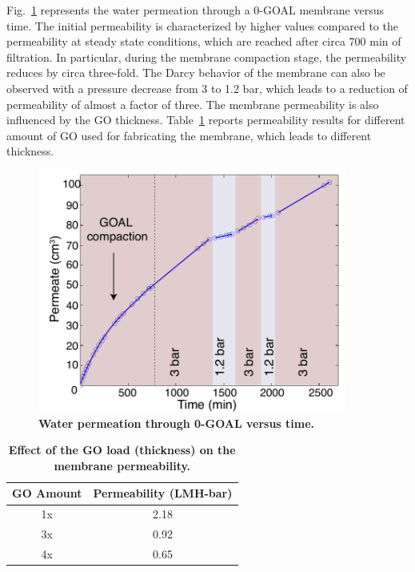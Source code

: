 Fig.~\ref{figS8_AppC} represents the water permeation through a 0-GOAL membrane versus time. The initial permeability is characterized by higher values compared to the permeability at steady state conditions, which are reached after circa 700 min of filtration. In particular, during the membrane compaction stage, the permeability reduces by circa three-fold. The Darcy behavior of the membrane can also be observed with a pressure decrease from 3 to 1.2 bar, which leads to a reduction of permeability of almost a factor of three. The membrane permeability is also influenced by the GO thickness. Table~\ref{tblS2_AppC} reports permeability results for different amount of GO used for fabricating the membrane, which leads to different thickness.

\begin{figure}[h!]
  \centering
  \includegraphics[width=4in]{paper4/FigS8.pdf}
  \caption{\textbf{Water permeation through 0-GOAL versus time.}} 
  \label{figS8_AppC}
\end{figure}


\begin{table}[t!]
 \begin{center}
 \caption{\textbf{Effect of the GO load (thickness) on the membrane permeability.}}
  \label{tblS2_AppC}
  \begin{tabular}{*2c}
    GO Amount & Permeability (LMH-bar)\\
    \hline
    1x & 2.18\\
    3x & 0.92\\
    4x & 0.65\\
    \hline
  \end{tabular}
 \end{center}
\end{table}

